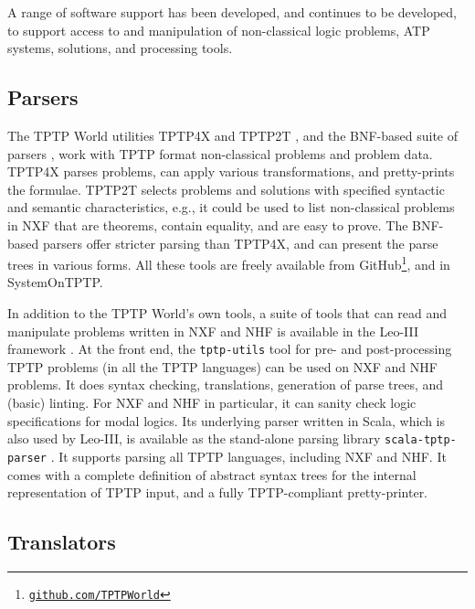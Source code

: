 \documentclass[runningheads]{llncs}
\begin{document}
A range of software support has been developed, and continues to be developed, to support
access to and manipulation of non-classical logic problems, ATP systems, solutions, and
processing tools.

\subsection{Parsers}
\label{Parsers}

The TPTP World utilities TPTP4X and TPTP2T \cite{Sut07-CSR,Sut10}, and the BNF-based suite
of parsers \cite{VS06}, work with TPTP format non-classical problems and problem data.
TPTP4X parses problems, can apply various transformations, and pretty-prints the formulae.
TPTP2T selects problems and solutions with specified syntactic and semantic characteristics,
e.g., it could be used to list non-classical problems in NXF that are theorems, contain equality,
and are easy to prove.
The BNF-based parsers offer stricter parsing than TPTP4X, and can present the parse trees in
various forms.
All these tools are freely available from GitHub\footnote{%
\href{https://github.com/TPTPWorld}{\tt github.com/TPTPWorld}}, and in SystemOnTPTP.

In addition to the TPTP World's own tools, a suite of tools that can read and manipulate 
problems written in NXF and NHF is available in the Leo-III framework \cite{SB21}.
At the front end, the {\tt tptp-utils} tool \cite{Ste22-TU} for pre- and post-processing TPTP 
problems (in all the TPTP languages) can be used on NXF and NHF problems.
It does syntax checking, translations, generation of parse trees, and (basic) linting.
For NXF and NHF in particular, it can sanity check logic specifications for modal logics.
Its underlying parser written in Scala, which is also used by Leo-III, is available as the 
stand-alone parsing library {\tt scala-tptp-parser} \cite{Ste21}.
It supports parsing all TPTP languages, including NXF and NHF.
It comes with a complete definition of abstract syntax trees for the internal representation 
of TPTP input, and a fully TPTP-compliant pretty-printer. 

\subsection{Translators}
\label{Parsers}
\end{document}
